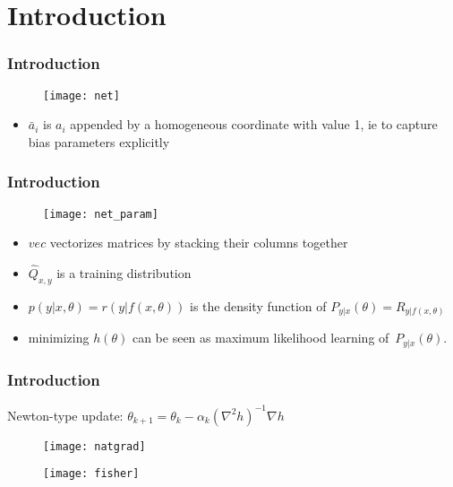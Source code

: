\section{Introduction}

\begin{frame}
\frametitle{Introduction}

\begin{figure}
    \centering
    \texttt{[image: net]}
\end{figure}

\begin{itemize}
    \item $\bar{a}_i$ is $a_i$ appended by a homogeneous coordinate with value 1, ie
            to capture bias parameters explicitly
\end{itemize}
\end{frame}

\begin{frame}
\frametitle{Introduction}

\begin{figure}
    \centering
    \texttt{[image: net\_param]}
\end{figure}

\begin{itemize}
    \item $vec$ vectorizes matrices by stacking their columns together
    \item $\hat{Q}_{x, y}$ is a training distribution
    \item $p(y|x, \theta) = r(y|f(x, \theta))$ is the density function of $P_{y|x}(\theta) = R_{y|f(x,\theta)}$
    \item minimizing $h(\theta)$ can be seen as maximum likelihood learning of~$P_{y|x}(\theta)$.
\end{itemize}

\end{frame}

\begin{frame}
\frametitle{Introduction}
Newton-type update: $\theta_{k+1} = \theta_k - \alpha_k (\nabla^2 h)^{-1} \nabla h$
\begin{figure}
    \raggedright
    \texttt{[image: natgrad]}
\end{figure}

\begin{figure}
    \raggedright
    \texttt{[image: fisher]}
\end{figure}

\end{frame}
